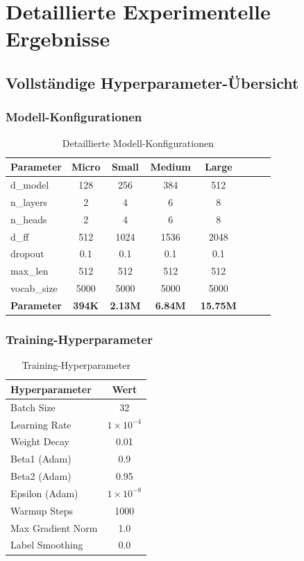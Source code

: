 \chapter{Detaillierte Experimentelle Ergebnisse}
\label{app:results}

\section{Vollständige Hyperparameter-Übersicht}

\subsection{Modell-Konfigurationen}

\begin{table}[h]
\centering
\small
\begin{tabular}{|l|c|c|c|c|c|c|c|}
\hline
\textbf{Parameter} & \textbf{Micro} & \textbf{Small} & \textbf{Medium} & \textbf{Large} \\
\hline
d\_model & 128 & 256 & 384 & 512 \\
n\_layers & 2 & 4 & 6 & 8 \\
n\_heads & 2 & 4 & 6 & 8 \\
d\_ff & 512 & 1024 & 1536 & 2048 \\
dropout & 0.1 & 0.1 & 0.1 & 0.1 \\
max\_len & 512 & 512 & 512 & 512 \\
vocab\_size & 5000 & 5000 & 5000 & 5000 \\
\hline
\textbf{Parameter} & \textbf{394K} & \textbf{2.13M} & \textbf{6.84M} & \textbf{15.75M} \\
\hline
\end{tabular}
\caption{Detaillierte Modell-Konfigurationen}
\label{tab:detailed_model_configs}
\end{table}

\subsection{Training-Hyperparameter}

\begin{table}[h]
\centering
\begin{tabular}{|l|c|}
\hline
\textbf{Hyperparameter} & \textbf{Wert} \\
\hline
Batch Size & 32 \\
Learning Rate & $1 \times 10^{-4}$ \\
Weight Decay & 0.01 \\
Beta1 (Adam) & 0.9 \\
Beta2 (Adam) & 0.95 \\
Epsilon (Adam) & $1 \times 10^{-8}$ \\
Warmup Steps & 1000 \\
Max Gradient Norm & 1.0 \\
Label Smoothing & 0.0 \\
\hline
\end{tabular}
\caption{Training-Hyperparameter}
\label{tab:training_hyperparameters}
\end{table}

